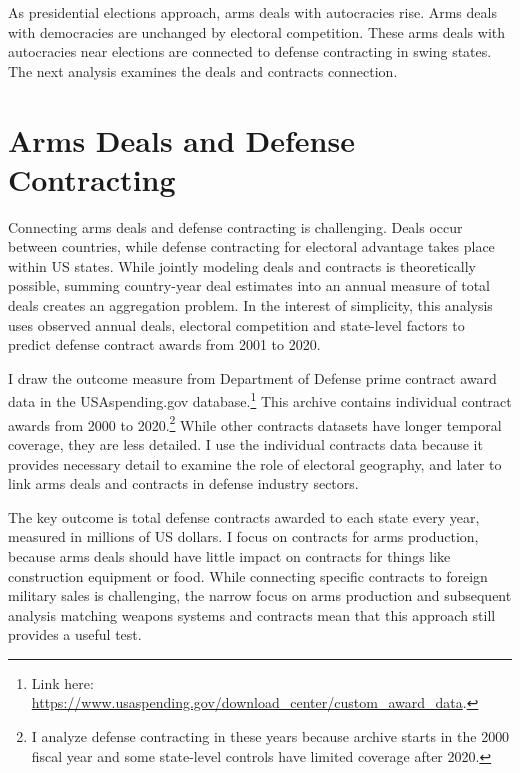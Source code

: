 \documentclass[12pt]{article}
\begin{document}
As presidential elections approach, arms deals with autocracies rise. 
Arms deals with democracies are unchanged by electoral competition.
These arms deals with autocracies near elections are connected to defense contracting in swing states. 
The next analysis examines the deals and contracts connection.


\section{Arms Deals and Defense Contracting}


Connecting arms deals and defense contracting is challenging. 
Deals occur between countries, while defense contracting for electoral advantage takes place within US states.
While jointly modeling deals and contracts is theoretically possible, summing country-year deal estimates into an annual measure of total deals creates an aggregation problem. %
In the interest of simplicity, this analysis uses observed annual deals, electoral competition and state-level factors to predict defense contract awards from 2001 to 2020. 


I draw the outcome measure from Department of Defense prime contract award data in the USAspending.gov database.\footnote{Link here: \url{https://www.usaspending.gov/download_center/custom_award_data}.} 
This archive contains individual contract awards from 2000 to 2020.\footnote{I analyze defense contracting in these years because archive starts in the 2000 fiscal year and some state-level controls have limited coverage after 2020.}
While other contracts datasets have longer temporal coverage, they are less detailed.
I use the individual contracts data because it provides necessary detail to examine the role of electoral geography, and later to link arms deals and contracts in defense industry sectors. 


The key outcome is total defense contracts awarded to each state every year, measured in millions of US dollars.
I focus on contracts for arms production, because arms deals should have little impact on contracts for things like construction equipment or food.
While connecting specific contracts to foreign military sales is challenging, the narrow focus on arms production and subsequent analysis matching weapons systems and contracts mean that this approach still provides a useful test. 
\end{document}
